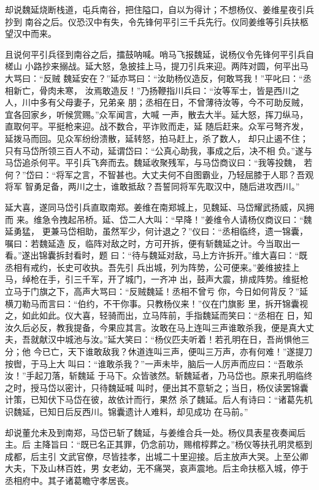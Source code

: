 却说魏延烧断栈道，屯兵南谷，把住隘口，自以为得计；不想杨仪、姜维星夜引兵抄到
南谷之后。仪恐汉中有失，令先锋何平引三千兵先行。仪同姜维等引兵扶柩望汉中而来。

且说何平引兵径到南谷之后，擂鼓呐喊。哨马飞报魏延，说杨仪令先锋何平引兵自槎山
小路抄来搦战。延大怒，急披挂上马，提刀引兵来迎。两阵对圆，何平出马大骂曰：“反贼
魏延安在？”延亦骂曰：“汝助杨仪造反，何敢骂我！”平叱曰：“丞相新亡，骨肉未寒，
汝焉敢造反！”乃扬鞭指川兵曰：“汝等军士，皆是西川之人，川中多有父母妻子，兄弟亲
朋；丞相在日，不曾薄待汝等，今不可助反贼，宜各回家乡，听候赏赐。”众军闻言，大喊
一声，散去大半。延大怒，挥刀纵马，直取何平。平挺枪来迎。战不数合，平诈败而走，延
随后赶来。众军弓弩齐发，延拨马而回。见众军纷纷溃散，延转怒，拍马赶上，杀了数人，
却只止遏不住；只有马岱所领三百人不动，延谓岱曰：“公真心助我，事成之后，决不相
负。”遂与马岱追杀何平。平引兵飞奔而去。魏延收聚残军，与马岱商议曰：“我等投魏，
若何？”岱曰：“将军之言，不智甚也。大丈夫何不自图霸业，乃轻屈膝于人耶？吾观将军
智勇足备，两川之士，谁敢抵敌？吾誓同将军先取汉中，随后进攻西川。”

延大喜，遂同马岱引兵直取南郑。姜维在南郑城上，见魏延、马岱耀武扬威，风拥而
来。维急令拽起吊桥。延、岱二人大叫：“早降！”姜维令人请杨仪商议曰：“魏延勇猛，
更兼马岱相助，虽然军少，何计退之？”仪曰：“丞相临终，遗一锦囊，嘱曰：若魏延造
反，临阵对敌之时，方可开拆，便有斩魏延之计。今当取出一看。”遂出锦囊拆封看时，题
曰：“待与魏延对敌，马上方许拆开。”维大喜曰：“既丞相有戒约，长史可收执。吾先引
兵出城，列为阵势，公可便来。”姜维披挂上马，绰枪在手，引三千军，开了城门，一齐冲
出，鼓声大震，排成阵势。维挺枪立马于门旗之下，高声大骂曰：“反贼魏延！丞相不曾亏
你，今日如何背反？”延横刀勒马而言曰：“伯约，不干你事。只教杨仪来！”仪在门旗影
里，拆开锦囊视之，如此如此。仪大喜，轻骑而出，立马阵前，手指魏延而笑曰：“丞相在
日，知汝久后必反，教我提备，今果应其言。汝敢在马上连叫三声谁敢杀我，便是真大丈
夫，吾就献汉中城池与汝。”延大笑曰：“杨仪匹夫听着！若孔明在日，吾尚惧他三分；他
今已亡，天下谁敢敌我？休道连叫三声，便叫三万声，亦有何难！”遂提刀按辔，于马上大
叫曰：“谁敢杀我？”一声未毕，脑后一人厉声而应曰：“吾敢杀汝！”手起刀落，斩魏延
于马下。众皆骇然。斩魏延者，乃马岱也。原来孔明临终之时，授马岱以密计，只待魏延喊
叫时，便出其不意斩之；当日，杨仪读罢锦囊计策，已知伏下马岱在彼，故依计而行，果然
杀了魏延。后人有诗曰：“诸葛先机识魏延，已知日后反西川。锦囊遗计人难料，却见成功
在马前。”

却说董允未及到南郑，马岱已斩了魏延，与姜维合兵一处。杨仪具表星夜奏闻后主。后
主降旨曰：“既已名正其罪，仍念前功，赐棺椁葬之。”杨仪等扶孔明灵柩到成都，后主引
文武官僚，尽皆挂孝，出城二十里迎接。后主放声大哭。上至公卿大夫，下及山林百姓，男
女老幼，无不痛哭，哀声震地。后主命扶柩入城，停于丞相府中。其子诸葛瞻守孝居丧。

